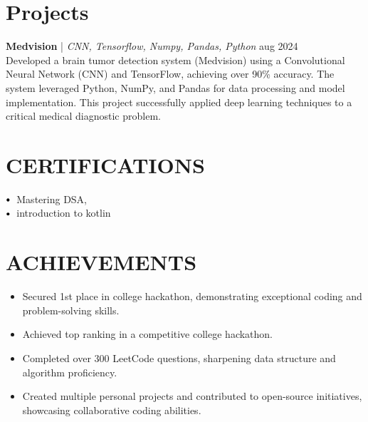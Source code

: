 \documentclass[letterpaper,11pt]{article}
\newcommand\sbullet[1][.5]{\mathbin{\vcenter{\hbox{\scalebox{#1}{$\bullet$}}}}}
\begin{document}
\section*{Projects}
\textbf{Medvision} \href{https://github.com/Priyanshu98156/MedVision}{\faExternalLink} | \textit{CNN, Tensorflow, Numpy, Pandas, Python} \hfill aug 2024 \\[2pt]
Developed a brain tumor detection system (Medvision) using a Convolutional Neural Network (CNN) and TensorFlow, achieving over 90\% accuracy.  The system leveraged Python, NumPy, and Pandas for data processing and model implementation.  This project successfully applied deep learning techniques to a critical medical diagnostic problem. \\[4pt]


\section{CERTIFICATIONS}
$\sbullet[.75] \hspace{0.1cm}$ Mastering DSA, \\
$\sbullet[.75] \hspace{0.1cm}$ introduction to kotlin \\

\section{ACHIEVEMENTS}
\begin{itemize}[leftmargin=*]
\item Secured 1st place in college hackathon, demonstrating exceptional coding and problem-solving skills.
\item Achieved top ranking in a competitive college hackathon.
\item Completed over 300 LeetCode questions, sharpening data structure and algorithm proficiency.
\item Created multiple personal projects and contributed to open-source initiatives, showcasing collaborative coding abilities.
\end{itemize}
\end{document}
